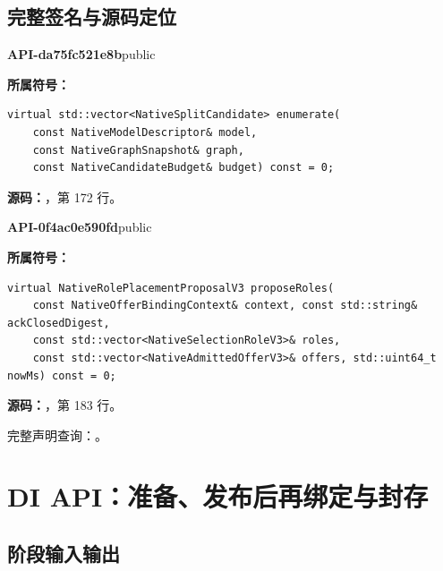 \subsection{完整签名与源码定位}

\textbf{API-da75fc521e8b}\quad public\par
\textbf{所属符号：}\par
\begin{Verbatim}[fontsize=\footnotesize,breaklines,breakanywhere]
virtual std::vector<NativeSplitCandidate> enumerate(
    const NativeModelDescriptor& model,
    const NativeGraphSnapshot& graph,
    const NativeCandidateBudget& budget) const = 0;
\end{Verbatim}
\textbf{源码：}，第 172 行。\par

\textbf{API-0f4ac0e590fd}\quad public\par
\textbf{所属符号：}\par
\begin{Verbatim}[fontsize=\footnotesize,breaklines,breakanywhere]
virtual NativeRolePlacementProposalV3 proposeRoles(
    const NativeOfferBindingContext& context, const std::string& ackClosedDigest,
    const std::vector<NativeSelectionRoleV3>& roles,
    const std::vector<NativeAdmittedOfferV3>& offers, std::uint64_t nowMs) const = 0;
\end{Verbatim}
\textbf{源码：}，第 183 行。\par

完整声明查询：。

\section{DI API：准备、发布后再绑定与封存}

\subsection{阶段输入输出}


